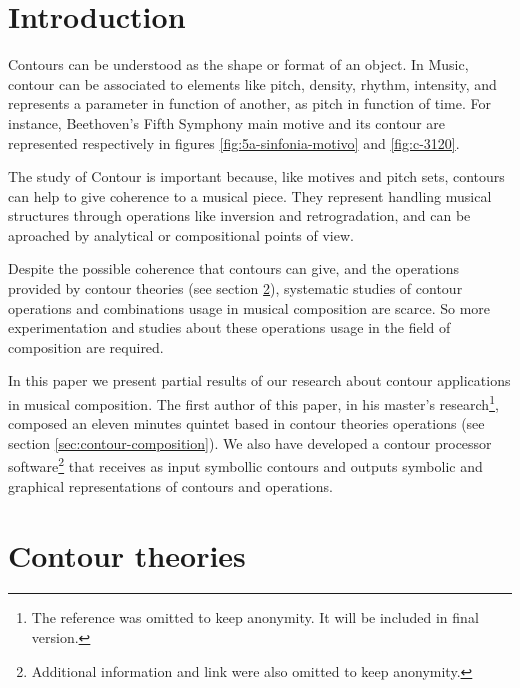 

\section{Introduction}
\label{sec:introduction}

Contours can be understood as the shape or format of an object. In
Music, contour can be associated to elements like pitch, density,
rhythm, intensity, and represents a parameter in function of another,
as pitch in function of time. For instance, Beethoven's Fifth Symphony
main motive and its contour are represented respectively in figures
\ref{fig:5a-sinfonia-motivo} and \ref{fig:c-3120}.

The study of Contour is important because, like motives and pitch
sets, contours can help to give coherence to a musical piece. They
represent handling musical structures through operations like
inversion and retrogradation, and can be aproached by analytical or
compositional points of view.

Despite the possible coherence that contours can give, and the
operations provided by contour theories (see section
\ref{sec:contour-theories}), systematic studies of contour operations
and combinations usage in musical composition are scarce. So more
experimentation and studies about these operations usage in the field
of composition are required.

In this paper we present partial results of our research about contour
applications in musical composition. The first author of this paper,
in his master's research\footnote{The reference was omitted to keep
  anonymity. It will be included in final version.}, composed an
eleven minutes quintet based in contour theories operations (see
section \ref{sec:contour-composition}). We also have developed a
contour processor software\footnote{Additional information and link
  were also omitted to keep anonymity.} that receives as input
symbollic contours and outputs symbolic and graphical representations
of contours and operations.

\section{Contour theories}
\label{sec:contour-theories}

